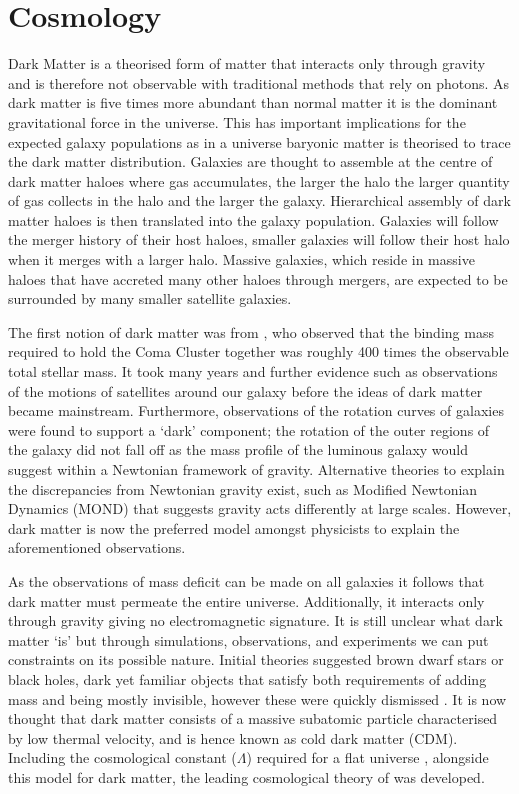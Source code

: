 \section{\LCDM Cosmology}
\label{sec:introLCDM}
Dark Matter is a theorised form of matter that interacts only through gravity and is therefore not observable with traditional methods that rely on photons. As dark matter is five times more abundant than normal matter it is the dominant gravitational force in the universe. This has important implications for the expected galaxy populations as in a \LCDM universe baryonic matter is theorised to trace the dark matter distribution. Galaxies are thought to assemble at the centre of dark matter haloes where gas accumulates, the larger the halo the larger quantity of gas collects in the halo and the larger the galaxy. Hierarchical assembly of dark matter haloes is then translated into the galaxy population. Galaxies will follow the merger history of their host haloes, smaller galaxies will follow their host halo when it merges with a larger halo. Massive galaxies, which reside in massive haloes that have accreted many other haloes through mergers, are expected to be surrounded by many smaller satellite galaxies.

The first notion of dark matter was from \citet{Zwicky1933DieNebeln}, who observed that the binding mass required to hold the Coma Cluster together was roughly 400 times the observable total stellar mass. It took many years and further evidence such as observations of the motions of satellites around our galaxy before the ideas of dark matter became mainstream. Furthermore, observations of the rotation curves of galaxies \citep{Roberts1973ComparisonTypes} were found to support a `dark' component; the rotation of the outer regions of the galaxy did not fall off as the mass profile of the luminous galaxy would suggest within a Newtonian framework of gravity. Alternative theories to explain the discrepancies from Newtonian gravity exist, such as Modified Newtonian Dynamics (MOND) that suggests gravity acts differently at large scales. However, dark matter is now the preferred model amongst physicists to explain the aforementioned observations. 

 As the observations of mass deficit can be made on all galaxies it follows that dark matter must permeate the entire universe. Additionally, it interacts only through gravity giving no electromagnetic signature. It is still unclear what dark matter `is' but through simulations, observations, and experiments we can put constraints on its possible nature. Initial theories suggested brown dwarf stars or black holes, dark yet familiar objects that satisfy both requirements of adding mass and being mostly invisible, however these were quickly dismissed \cite{Gibson1997TheHalo}. It is now thought that dark matter consists of a massive subatomic particle characterised by low thermal velocity, and is hence known as cold dark matter (CDM). Including the cosmological constant ($\Lambda$) required for a flat universe \cite{Einstein1917SitzungRelativitatstheorie, Ade2016PlanckResults}, alongside this model for dark matter, the leading cosmological theory of \LCDM was developed. 

